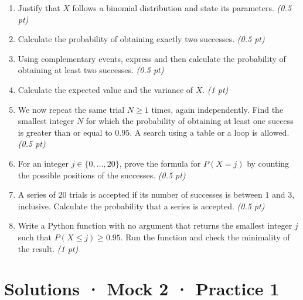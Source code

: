 \begin{enumerate}

\item Justify that $X$ follows a binomial distribution and state its parameters. \hfill\textit{(0.5 pt)}

\item Calculate the probability of obtaining exactly two successes. \hfill\textit{(0.5 pt)}

\item Using complementary events, express and then calculate the probability of obtaining at least two successes. \hfill\textit{(0.5 pt)}

\item Calculate the expected value and the variance of $X$. \hfill\textit{(1 pt)}

\item We now repeat the same trial $N\ge1$ times, again independently. Find the smallest integer $N$ for which the probability of obtaining at least one success is greater than or equal to $\num{0,95}$. A search using a table or a loop is allowed. \hfill\textit{(0.5 pt)}

\item For an integer $j\in\{0,\ldots,20\}$, prove the formula for $P(X=j)$ by counting the possible positions of the successes. \hfill\textit{(0.5 pt)}

\item A series of $20$ trials is accepted if its number of successes is between $1$ and $3$, inclusive. Calculate the probability that a series is accepted. \hfill\textit{(0.5 pt)}

\item Write a Python function with no argument that returns the smallest integer $j$ such that $P(X\le j)\ge\num{0,95}$. Run the function and check the minimality of the result. \hfill\textit{(1 pt)}

\end{enumerate}

\ifmxteacher\mxnewpage

\section*{Solutions · Mock 2 · Practice 1}\label{cor:8-1}


